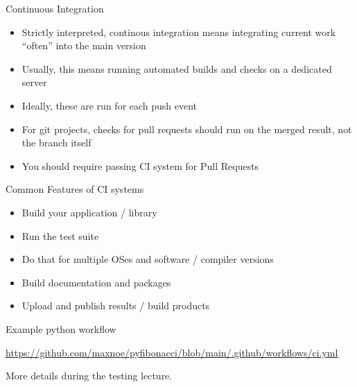 \begin{frame}[c]{Continuous Integration}
  \begin{itemize}
    \item Strictly interpreted, continous integration means integrating current work
      \enquote{often} into the main version
    \item Usually, this means running automated builds and checks on a dedicated server
    \item Ideally, these are run for each push event
    \item For git projects, checks for pull requests should run on the merged result, not the branch itself
    \item You should require passing CI system for Pull Requests
  \end{itemize}
\end{frame}

\begin{frame}[c]{Common Features of CI systems}
  \begin{itemize}
    \item Build your application / library
    \item Run the test suite
    \item Do that for multiple OSes and software / compiler versions
    \item Build documentation and packages
    \item Upload and publish results / build products
  \end{itemize}
\end{frame}

\begin{frame}[c, fragile]{Example python workflow}
  \begin{center}\large
    \url{https://github.com/maxnoe/pyfibonacci/blob/main/.github/workflows/ci.yml}

    More details during the testing lecture.
  \end{center}
\end{frame}
